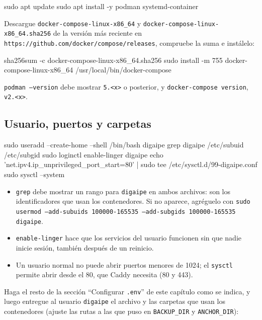 \begin{codigo}
sudo apt update
sudo apt install -y podman systemd-container
\end{codigo}

Descargue \texttt{docker-compose-linux-x86\_64} y \texttt{docker-compose-linux-x86\_64.sha256}
de la versión más reciente en \texttt{https://github.com/docker/compose/releases}, compruebe la
suma e instálelo:

\begin{codigo}
sha256sum -c docker-compose-linux-x86_64.sha256
sudo install -m 755 docker-compose-linux-x86_64 /usr/local/bin/docker-compose
\end{codigo}

\begin{comprobar}
	\texttt{podman --version} debe mostrar \texttt{5.<x>} o posterior, y
	\texttt{docker-compose version}, \texttt{v2.<x>}.
\end{comprobar}

\subsection{Usuario, puertos y carpetas}

\begin{codigo}
sudo useradd --create-home --shell /bin/bash digaipe
grep digaipe /etc/subuid /etc/subgid
sudo loginctl enable-linger digaipe
echo 'net.ipv4.ip_unprivileged_port_start=80' | sudo tee /etc/sysctl.d/99-digaipe.conf
sudo sysctl --system
\end{codigo}

\begin{itemize}
	\item \texttt{grep} debe mostrar un rango para \texttt{digaipe} en ambos archivos: son los
	      identificadores que usan los contenedores. Si no aparece, agréguelo con
	      \texttt{sudo usermod --add-subuids 100000-165535 --add-subgids 100000-165535 digaipe}.
	\item \texttt{enable-linger} hace que los servicios del usuario funcionen sin que nadie inicie
	      sesión, también después de un reinicio.
	\item Un usuario normal no puede abrir puertos menores de 1024; el \texttt{sysctl} permite
	      abrir desde el 80, que Caddy necesita (80 y 443).
\end{itemize}

Haga el resto de la sección ``Configurar \texttt{.env}'' de este capítulo como se indica, y
luego entregue al usuario \texttt{digaipe} el archivo y las carpetas que usan los contenedores
(ajuste las rutas a las que puso en \texttt{BACKUP\_DIR} y \texttt{ANCHOR\_DIR}):

